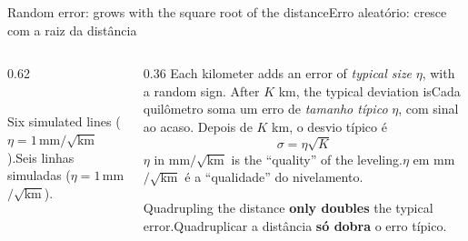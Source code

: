 \documentclass[aspectratio=169,11pt]{beamer}
\newcommand{\tr}[2]{\ifEN#2\else#1\fi}
\newcommand{\bnum}[1]{\ifmmode\textcolor{mTeal}{\mathbf{#1}}\else\textbf{\textcolor{mTeal}{#1}}\fi}
\newcommand{\passeioA}[1]{\draw[#1] plot coordinates {(0.00,0.00) (0.07,-0.02) (0.14,-0.04) (0.21,-0.05) (0.28,0.03) (0.35,0.02) (0.42,-0.16) (0.49,-0.12) (0.56,-0.15) (0.63,-0.18) (0.70,-0.17) (0.77,-0.14) (0.84,0.00) (0.91,0.08) (0.98,0.09) (1.05,0.00) (1.12,-0.12) (1.19,-0.09) (1.26,0.07) (1.33,0.07) (1.40,0.06) (1.47,0.13) (1.54,-0.05) (1.61,-0.09) (1.68,-0.03) (1.75,0.08) (1.82,0.05) (1.89,0.09) (1.96,0.12) (2.03,0.22) (2.10,0.08) (2.17,0.15) (2.24,-0.03) (2.31,-0.34) (2.38,-0.42) (2.45,-0.53) (2.52,-0.42) (2.59,-0.34) (2.66,-0.49) (2.73,-0.39) (2.80,-0.51) (2.87,-0.52) (2.94,-0.55) (3.01,-0.54) (3.08,-0.44) (3.15,-0.36) (3.22,-0.32) (3.29,-0.24) (3.36,-0.19) (3.43,-0.26) (3.50,-0.35) (3.57,-0.40) (3.64,-0.34) (3.71,-0.37) (3.78,-0.09) (3.85,-0.19) (3.92,-0.32) (3.99,-0.23) (4.06,-0.06) (4.13,-0.00) (4.20,0.10) (4.27,0.27) (4.34,0.26) (4.41,0.09) (4.48,0.02) (4.55,0.14) (4.62,-0.03) (4.69,-0.03) (4.76,0.00) (4.83,-0.04) (4.90,0.05) (4.97,0.12) (5.04,0.40) (5.11,0.47) (5.18,0.40) (5.25,0.33) (5.32,0.23) (5.39,0.35) (5.46,0.28) (5.53,0.27) (5.60,0.36) (5.67,0.27) (5.74,0.24) (5.81,0.02) (5.88,-0.11) (5.95,-0.18) (6.02,-0.13) (6.09,0.01) (6.16,0.01) (6.23,0.04) (6.30,0.06) (6.37,0.19) (6.44,0.30) (6.51,0.33) (6.58,0.21) (6.65,0.32) (6.72,0.36) (6.79,0.51) (6.86,0.51) (6.93,0.74) (7.00,0.70)};}
\newcommand{\passeioB}[1]{\draw[#1] plot coordinates {(0.00,0.00) (0.07,0.19) (0.14,0.20) (0.21,0.14) (0.28,0.01) (0.35,-0.01) (0.42,0.16) (0.49,0.26) (0.56,0.34) (0.63,0.06) (0.70,0.14) (0.77,0.21) (0.84,0.14) (0.91,0.07) (0.98,0.07) (1.05,0.27) (1.12,0.15) (1.19,0.10) (1.26,0.26) (1.33,0.21) (1.40,0.16) (1.47,0.17) (1.54,0.02) (1.61,0.05) (1.68,-0.09) (1.75,0.01) (1.82,0.01) (1.89,0.29) (1.96,0.32) (2.03,0.48) (2.10,0.33) (2.17,0.31) (2.24,0.35) (2.31,0.56) (2.38,0.36) (2.45,0.48) (2.52,0.55) (2.59,0.73) (2.66,0.82) (2.73,0.82) (2.80,0.76) (2.87,0.61) (2.94,0.64) (3.01,0.61) (3.08,0.86) (3.15,0.78) (3.22,0.82) (3.29,0.63) (3.36,0.58) (3.43,0.62) (3.50,0.71) (3.57,0.89) (3.64,0.88) (3.71,0.75) (3.78,0.80) (3.85,0.87) (3.92,0.93) (3.99,0.84) (4.06,0.98) (4.13,0.99) (4.20,1.07) (4.27,1.22) (4.34,1.30) (4.41,1.33) (4.48,1.59) (4.55,1.62) (4.62,1.58) (4.69,1.60) (4.76,1.78) (4.83,1.79) (4.90,1.85) (4.97,2.00) (5.04,1.93) (5.11,1.73) (5.18,1.76) (5.25,1.79) (5.32,1.72) (5.39,1.82) (5.46,1.89) (5.53,1.78) (5.60,1.84) (5.67,1.81) (5.74,1.64) (5.81,1.69) (5.88,1.69) (5.95,1.60) (6.02,1.66) (6.09,1.72) (6.16,1.65) (6.23,1.70) (6.30,1.82) (6.37,1.73) (6.44,1.78) (6.51,1.78) (6.58,2.05) (6.65,1.83) (6.72,1.91) (6.79,1.87) (6.86,1.86) (6.93,2.09) (7.00,2.09)};}
\newcommand{\passeioC}[1]{\draw[#1] plot coordinates {(0.00,0.00) (0.07,0.27) (0.14,0.22) (0.21,0.26) (0.28,0.20) (0.35,0.12) (0.42,0.12) (0.49,0.09) (0.56,0.11) (0.63,-0.14) (0.70,0.10) (0.77,0.08) (0.84,0.29) (0.91,0.17) (0.98,0.21) (1.05,0.58) (1.12,0.48) (1.19,0.30) (1.26,0.24) (1.33,0.29) (1.40,0.38) (1.47,0.53) (1.54,0.50) (1.61,0.31) (1.68,0.25) (1.75,0.40) (1.82,0.46) (1.89,0.22) (1.96,0.22) (2.03,0.39) (2.10,0.64) (2.17,0.71) (2.24,0.75) (2.31,0.60) (2.38,0.50) (2.45,0.50) (2.52,0.56) (2.59,0.63) (2.66,0.58) (2.73,0.44) (2.80,0.34) (2.87,0.21) (2.94,0.28) (3.01,0.01) (3.08,-0.03) (3.15,0.02) (3.22,0.20) (3.29,0.21) (3.36,0.33) (3.43,0.28) (3.50,0.19) (3.57,0.11) (3.64,0.30) (3.71,0.42) (3.78,0.47) (3.85,0.87) (3.92,0.87) (3.99,0.94) (4.06,0.98) (4.13,0.95) (4.20,1.23) (4.27,1.41) (4.34,1.25) (4.41,1.20) (4.48,1.25) (4.55,1.34) (4.62,1.18) (4.69,0.91) (4.76,0.68) (4.83,0.67) (4.90,0.66) (4.97,0.70) (5.04,0.61) (5.11,0.46) (5.18,0.22) (5.25,0.26) (5.32,0.30) (5.39,0.42) (5.46,0.52) (5.53,0.49) (5.60,0.66) (5.67,0.64) (5.74,0.56) (5.81,0.50) (5.88,0.43) (5.95,0.17) (6.02,0.19) (6.09,0.22) (6.16,0.17) (6.23,0.09) (6.30,0.13) (6.37,0.34) (6.44,0.34) (6.51,0.28) (6.58,0.21) (6.65,0.20) (6.72,0.05) (6.79,0.04) (6.86,0.04) (6.93,0.27) (7.00,0.38)};}
\newcommand{\passeioD}[1]{\draw[#1] plot coordinates {(0.00,0.00) (0.07,0.12) (0.14,0.04) (0.21,0.12) (0.28,-0.02) (0.35,0.02) (0.42,0.07) (0.49,-0.02) (0.56,0.22) (0.63,0.29) (0.70,0.06) (0.77,0.12) (0.84,0.08) (0.91,0.08) (0.98,0.13) (1.05,0.18) (1.12,-0.07) (1.19,-0.21) (1.26,-0.11) (1.33,0.04) (1.40,0.27) (1.47,0.49) (1.54,0.24) (1.61,0.33) (1.68,0.10) (1.75,0.30) (1.82,0.33) (1.89,0.19) (1.96,0.43) (2.03,0.51) (2.10,0.28) (2.17,0.32) (2.24,0.23) (2.31,0.24) (2.38,0.19) (2.45,0.35) (2.52,0.18) (2.59,0.22) (2.66,0.44) (2.73,0.34) (2.80,0.36) (2.87,0.39) (2.94,0.30) (3.01,0.38) (3.08,0.39) (3.15,0.28) (3.22,0.49) (3.29,0.59) (3.36,0.57) (3.43,0.49) (3.50,0.40) (3.57,0.54) (3.64,0.53) (3.71,0.58) (3.78,0.56) (3.85,0.63) (3.92,0.62) (3.99,0.71) (4.06,0.69) (4.13,0.79) (4.20,0.87) (4.27,0.86) (4.34,0.75) (4.41,0.64) (4.48,0.55) (4.55,0.43) (4.62,0.54) (4.69,0.53) (4.76,0.72) (4.83,0.99) (4.90,1.00) (4.97,0.81) (5.04,0.76) (5.11,0.76) (5.18,0.58) (5.25,0.55) (5.32,0.58) (5.39,0.53) (5.46,0.43) (5.53,0.34) (5.60,0.56) (5.67,0.54) (5.74,0.44) (5.81,0.39) (5.88,0.51) (5.95,0.43) (6.02,0.48) (6.09,0.57) (6.16,0.66) (6.23,0.83) (6.30,0.76) (6.37,0.90) (6.44,0.80) (6.51,0.76) (6.58,0.90) (6.65,1.00) (6.72,1.00) (6.79,0.86) (6.86,0.92) (6.93,0.85) (7.00,0.74)};}
\newcommand{\passeioE}[1]{\draw[#1] plot coordinates {(0.00,0.00) (0.07,-0.08) (0.14,-0.05) (0.21,-0.30) (0.28,-0.26) (0.35,-0.24) (0.42,-0.31) (0.49,-0.18) (0.56,-0.11) (0.63,-0.18) (0.70,-0.26) (0.77,-0.18) (0.84,-0.36) (0.91,-0.40) (0.98,-0.48) (1.05,-0.47) (1.12,-0.44) (1.19,-0.44) (1.26,-0.30) (1.33,-0.28) (1.40,-0.31) (1.47,-0.46) (1.54,-0.37) (1.61,-0.31) (1.68,-0.14) (1.75,-0.23) (1.82,-0.22) (1.89,-0.23) (1.96,-0.24) (2.03,-0.24) (2.10,-0.44) (2.17,-0.35) (2.24,-0.27) (2.31,-0.13) (2.38,0.14) (2.45,0.10) (2.52,0.10) (2.59,0.10) (2.66,0.33) (2.73,0.12) (2.80,0.18) (2.87,0.00) (2.94,-0.31) (3.01,-0.55) (3.08,-0.71) (3.15,-0.59) (3.22,-0.69) (3.29,-0.72) (3.36,-0.86) (3.43,-0.78) (3.50,-0.92) (3.57,-0.76) (3.64,-0.88) (3.71,-0.97) (3.78,-0.95) (3.85,-0.95) (3.92,-0.78) (3.99,-0.77) (4.06,-0.91) (4.13,-0.98) (4.20,-1.05) (4.27,-0.96) (4.34,-0.91) (4.41,-0.93) (4.48,-0.82) (4.55,-0.89) (4.62,-0.90) (4.69,-0.88) (4.76,-0.70) (4.83,-0.71) (4.90,-0.75) (4.97,-0.88) (5.04,-0.79) (5.11,-0.87) (5.18,-0.82) (5.25,-1.05) (5.32,-0.93) (5.39,-1.09) (5.46,-1.18) (5.53,-1.05) (5.60,-1.21) (5.67,-1.22) (5.74,-1.21) (5.81,-1.33) (5.88,-1.17) (5.95,-0.99) (6.02,-1.23) (6.09,-1.40) (6.16,-1.31) (6.23,-1.46) (6.30,-1.51) (6.37,-1.49) (6.44,-1.41) (6.51,-1.44) (6.58,-1.43) (6.65,-1.52) (6.72,-1.36) (6.79,-1.42) (6.86,-1.38) (6.93,-1.44) (7.00,-1.43)};}
\newcommand{\passeioF}[1]{\draw[#1] plot coordinates {(0.00,0.00) (0.07,-0.02) (0.14,-0.04) (0.21,-0.16) (0.28,-0.07) (0.35,0.10) (0.42,0.13) (0.49,0.22) (0.56,0.32) (0.63,0.43) (0.70,0.47) (0.77,0.49) (0.84,0.60) (0.91,0.61) (0.98,0.49) (1.05,0.49) (1.12,0.27) (1.19,0.27) (1.26,0.32) (1.33,0.46) (1.40,0.48) (1.47,0.59) (1.54,0.59) (1.61,0.47) (1.68,0.30) (1.75,0.18) (1.82,0.02) (1.89,0.10) (1.96,0.07) (2.03,0.14) (2.10,0.15) (2.17,0.27) (2.24,0.40) (2.31,0.32) (2.38,0.29) (2.45,0.23) (2.52,0.03) (2.59,0.11) (2.66,0.26) (2.73,0.26) (2.80,0.20) (2.87,0.33) (2.94,0.05) (3.01,0.07) (3.08,0.08) (3.15,0.02) (3.22,0.18) (3.29,0.30) (3.36,0.27) (3.43,0.26) (3.50,0.21) (3.57,0.15) (3.64,-0.01) (3.71,0.16) (3.78,0.28) (3.85,0.38) (3.92,0.25) (3.99,0.50) (4.06,0.73) (4.13,0.76) (4.20,0.65) (4.27,0.54) (4.34,0.59) (4.41,0.48) (4.48,0.48) (4.55,0.61) (4.62,0.43) (4.69,0.67) (4.76,0.86) (4.83,0.71) (4.90,0.54) (4.97,0.51) (5.04,0.38) (5.11,0.35) (5.18,0.04) (5.25,0.01) (5.32,0.23) (5.39,0.10) (5.46,0.06) (5.53,-0.12) (5.60,-0.04) (5.67,-0.07) (5.74,0.17) (5.81,0.19) (5.88,0.15) (5.95,0.21) (6.02,0.15) (6.09,-0.01) (6.16,0.03) (6.23,0.01) (6.30,0.03) (6.37,0.07) (6.44,0.01) (6.51,0.06) (6.58,0.27) (6.65,0.14) (6.72,0.35) (6.79,0.32) (6.86,0.22) (6.93,0.52) (7.00,0.53)};}
\begin{document}
\begin{frame}{\tr{Erro aleatório: cresce com a raiz da distância}{Random error: grows with the
square root of the distance}}
  \begin{columns}[T]
    \begin{column}{0.62\textwidth}
      \centering
      \\[1pt]
      {\scriptsize\tr{Seis linhas simuladas ($\eta=\num{1}$\,mm$/\sqrt{\text{km}}$).}{Six simulated
      lines ($\eta=\num{1}$\,mm$/\sqrt{\text{km}}$).}}
    \end{column}
    \begin{column}{0.36\textwidth}
      \small
      \tr{Cada quilômetro soma um erro de \emph{tamanho típico} $\eta$, com sinal ao acaso.
      Depois de $K$ km, o desvio típico é}{Each kilometer adds an error of \emph{typical size}
      $\eta$, with a random sign. After $K$ km, the typical deviation is}
      \[
        \sigma=\eta\sqrt{K}
      \]
      \tr{$\eta$ em mm$/\sqrt{\text{km}}$ é a ``qualidade'' do nivelamento.}{$\eta$ in
      mm$/\sqrt{\text{km}}$ is the ``quality'' of the leveling.}
      \medskip

      \tr{Quadruplicar a distância \bnum{só dobra} o erro típico.}{Quadrupling the distance
      \bnum{only doubles} the typical error.}
    \end{column}
  \end{columns}
\end{frame}
\end{document}
